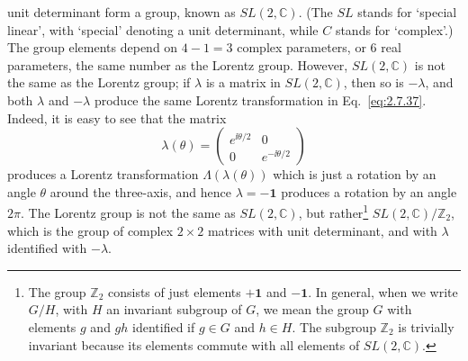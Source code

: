 unit determinant form a group, known as $SL(2,\mathbb{C})$. (The $SL$ stands for
`special linear', with `special' denoting a unit determinant, while $C$ stands
for `complex'.) The group elements depend on $4-1=3$ complex parameters, or 6
real parameters, the same number as the Lorentz group. However, $SL(2,\mathbb{C})$ is
not the same as the Lorentz group; if $\lambda$ is a matrix in $SL(2,\mathbb{C})$, then
so is $-\lambda$, and both $\lambda$ and $-\lambda$ produce the same Lorentz
transformation in Eq.~\eqref{eq:2.7.37}. Indeed, it is easy to see that the matrix
\begin{equation*}
  \lambda(\theta)=
  \begin{pmatrix}
    e^{\ii\theta/2} & 0\\
    0 & e^{-\ii\theta/2}
  \end{pmatrix}
\end{equation*}
produces a Lorentz transformation $\Lambda(\lambda(\theta))$ which is just a
rotation by an angle $\theta$ around the three-axis, and hence
$\lambda=-\mathbf{1}$ produces a rotation by an angle $2\pi$. The Lorentz group
is not the same as $SL(2,\mathbb{C})$, but rather\footnote{The group $\mathbb{Z}_2$ consists of just
elements $+\mathbf{1}$ and $-\mathbf{1}$. In general, when we write $G/H$, with
$H$ an invariant subgroup of $G$, we mean the group $G$ with elements $g$ and
$gh$ identified if $g\in G$ and $h\in H$. The subgroup $\mathbb{Z}_2$ is trivially
invariant because its elements commute with all elements of $SL(2,\mathbb{C})$.}
$SL(2,\mathbb{C})/\mathbb{Z}_2$, which is the group of complex $2\times2$ matrices with unit
determinant, and with $\lambda$ identified with $-\lambda$.

